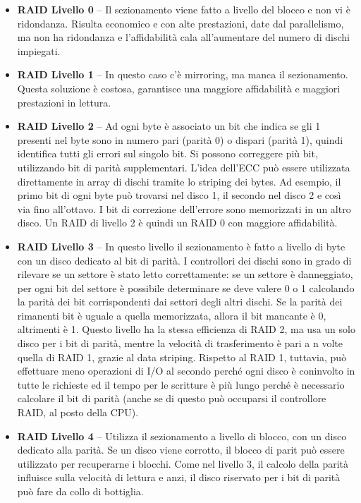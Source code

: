 \documentclass[a4paper]{article}
\begin{document}
\begin{itemize}
   \item \textbf{RAID Livello 0} -- Il sezionamento viene fatto a livello del blocco e non vi è ridondanza. Risulta economico e con alte prestazioni, date dal parallelismo, ma non ha ridondanza e l'affidabilità cala all'aumentare del numero di dischi impiegati.
   \item \textbf{RAID Livello 1} -- In questo caso c'è mirroring, ma manca il sezionamento. Questa soluzione è costosa, garantisce una maggiore affidabilità e maggiori prestazioni in lettura.
   \item \textbf{RAID Livello 2} -- Ad ogni byte è associato un bit che indica se gli 1 presenti nel byte sono in numero pari (parità 0) o dispari (parità 1), quindi identifica tutti gli errori sul singolo bit. Si possono correggere più bit, utilizzando bit di parità supplementari. L'idea dell'ECC può essere utilizzata direttamente in array di dischi tramite lo striping dei bytes. Ad esempio, il primo bit di ogni byte può trovarsi nel disco 1, il secondo nel disco 2 e così via fino all'ottavo. I bit di correzione dell'errore sono memorizzati in un altro disco. Un RAID di livello 2 è quindi un RAID 0 con maggiore affidabilità.
   \item \textbf{RAID Livello 3} -- In questo livello il sezionamento è fatto a livello di byte con un disco dedicato al bit di parità. I controllori dei dischi sono in grado di rilevare se un settore è stato letto correttamente: se un settore è danneggiato, per ogni bit del settore è possibile determinare se deve valere 0 o 1 calcolando la parità dei bit corrispondenti dai settori degli altri dischi. Se la parità dei rimanenti bit è uguale a quella memorizzata, allora il bit mancante è 0, altrimenti è 1. Questo livello ha la stessa efficienza di RAID 2, ma usa un solo disco per i bit di parità, mentre la velocità di trasferimento è pari a n volte quella di RAID 1, grazie al data striping. Rispetto al RAID 1, tuttavia, può effettuare meno operazioni di I/O al secondo perché ogni disco è coninvolto in tutte le richieste ed il tempo per le scritture è più lungo perché è necessario calcolare il bit di parità (anche se di questo può occuparsi il controllore RAID, al posto della CPU).
   \item \textbf{RAID Livello 4} -- Utilizza il sezionamento a livello di blocco, con un disco dedicato alla parità. Se un disco viene corrotto, il blocco di parit può essere utilizzato per recuperarne i blocchi. Come nel livello 3, il calcolo della parità influisce sulla velocità di lettura e anzi, il disco riservato per i bit di parità può fare da collo di bottiglia.

\end{itemize}
\end{document}
